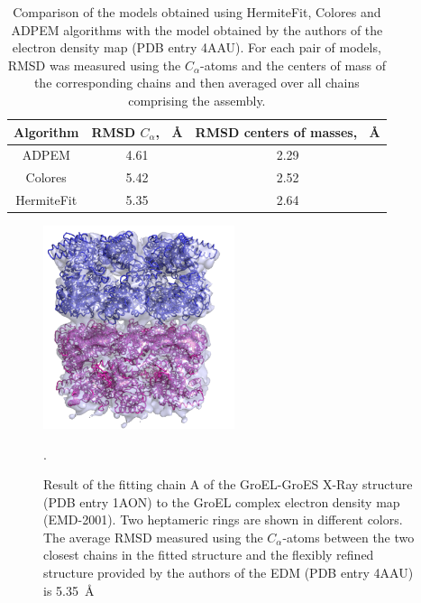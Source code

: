 \begin{table}[h]
\begin{centering}
\begin{tabular}{|c|c|c|}
\hline
Algorithm & RMSD $C_{\alpha}$, ~\AA & RMSD centers of masses, ~\AA \\ \hline 
ADP\underline{\hspace*{0.2cm}}EM & 4.61 & 2.29  \\ \hline 
Colores & 5.42 & 2.52  \\ \hline 
HermiteFit & 5.35 & 2.64 \\ \hline 
\end{tabular}
\medskip
\caption[Comparison of the models obtained using HermiteFit, Colores and ADP\underline{\hspace*{0.2cm}}EM algorithms by RMSD]{ 
Comparison of the models obtained using HermiteFit, Colores and ADP\underline{\hspace*{0.2cm}}EM algorithms with the model obtained by the authors of the electron density map (PDB entry 4AAU).
For each pair of models, RMSD was measured using the $C_{\alpha}$-atoms and the centers of mass of the corresponding chains and then averaged over all chains comprising the assembly.}
\label{table:RMSDComparisson}
\par\end{centering}
\end{table}


\begin{figure}[h]
\label{fig:GroEL_FIT}
\begin{centering}
\includegraphics[width=0.5\textwidth]{Hermite/Fig/figure8}
\par\end{centering}
\caption[Result of the fitting of the GroEL EDM]{Result of the fitting chain A of the GroEL-GroES X-Ray structure (PDB entry 1AON) to the GroEL complex electron density map (EMD-2001). 
Two heptameric rings are shown in different colors. The average RMSD  measured using the $C_{\alpha}$-atoms between the two closest chains in the fitted structure and the flexibly refined structure provided by the authors
of the EDM (PDB entry 4AAU) is 5.35~\AA} .
\end{figure}

